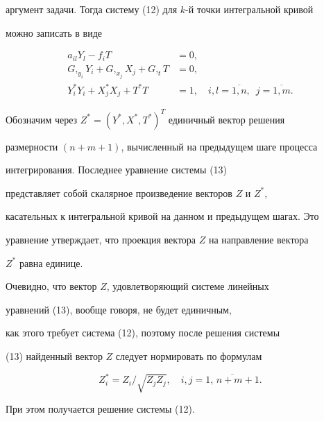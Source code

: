 аргумент задачи. Тогда систему (12) для $k$-й точки интегральной кривой


можно записать в виде


\begin{equation}


\begin{split}


a_{il}Y_l - f_iT & = 0,\\


G,_{y_i}Y_i + G,_{x_j}X_j + G,_tT & = 0,\\


Y_i^*Y_i + X_j^*X_j + T^*T & = 1,\quad


i, l=\overline{1, n},\; \ j=\overline{1, m}.


\end{split}


\end{equation}





Обозначим через $Z^*=(Y^*, X^*, T^*)^T$ единичный вектор решения


размерности $(n+m+1)$, вычисленный на предыдущем шаге процесса


интегрирования. Последнее уравнение системы (13)


представляет собой скалярное произведение векторов $Z$ и $Z^*$,


касательных к интегральной кривой на данном и предыдущем шагах. Это


уравнение утверждает, что проекция вектора $Z$ на направление вектора


$Z^*$ равна единице.





Очевидно, что вектор $Z$, удовлетворяющий системе линейных


уравнений (13), вообще говоря, не будет единичным,


как этого требует система (12), поэтому после решения системы


(13) найденный вектор $Z$ следует нормировать по формулам


\begin{equation}


Z_i^*=Z_i/\sqrt{Z_j Z_j},\quad


i,j=\overline{1,\, n+m+1}.


\end{equation}


При этом получается решение системы (12).





